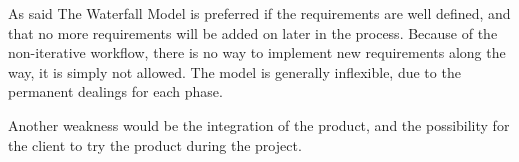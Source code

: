 \documentclass[../report.tex]{subfiles}
\begin{document}
As said The Waterfall Model is preferred if the requirements are well defined, and that no more requirements will be added on later in the process. Because of the non-iterative workflow, there is no way to implement new requirements along the way, it is simply not allowed. The model is generally inflexible, due to the permanent dealings for each phase.
 
Another weakness would be the integration of the product, and the possibility for the client to try the product during the project.
\end{document}
